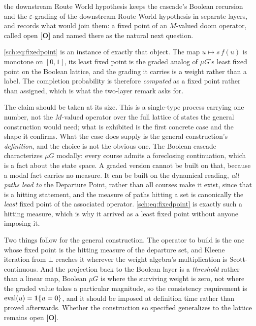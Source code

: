 \begin{remark}
\label{sch:rem:mvalued}
the downstream Route World hypothesis keeps the cascade's Boolean recursion and the
$\varepsilon$-grading of the downstream Route World hypothesis in separate
layers, and records what would join them: a fixed point of an
$M$-valued doom operator, called open \textbf{[O]} and named there as
the natural next question.

\eqref{sch:eq:fixedpoint} is an instance of exactly that object. The map
$u\mapsto s\,f(u)$ is monotone on $[0,1]$, its least fixed point is the
graded analog of $\mu G$'s least fixed point on the Boolean lattice,
and the grading it carries is a weight rather than a label. The
completion probability is therefore \emph{computed} as a fixed point
rather than assigned, which is what the two-layer remark asks for.

The claim should be taken at its size. This is a single-type process
carrying one number, not the $M$-valued operator over the full lattice
of states the general construction would need; what is exhibited is the
first concrete case and the shape it confirms. What the case does supply is the general construction's
\emph{definition}, and the choice is not the obvious one. The Boolean
cascade characterizes $\mu G$ modally: every course admits a foreclosing
continuation, which is a fact about the state space. A graded version
cannot be built on that, because a modal fact carries no measure. It can
be built on the dynamical reading, \emph{all paths lead to} the
Departure Point, rather than all courses make it exist, since that is
a hitting statement, and the measure of paths hitting a set is
canonically the \emph{least} fixed point of the associated operator.
\eqref{sch:eq:fixedpoint} is exactly such a hitting measure, which is why
it arrived as a least fixed point without anyone imposing it.

Two things follow for the general construction. The operator to build is
the one whose fixed point is the hitting measure of the departure set,
and Kleene iteration from $\bot$ reaches it wherever the weight algebra's
multiplication is Scott-continuous. And the projection back to the
Boolean layer is a \emph{threshold} rather than a linear map, Boolean
$\mu G$ is where the surviving weight is zero, not where the graded value
takes a particular magnitude, so the consistency requirement is
$\mathrm{eval}(u)=\mathbf{1}\{u=0\}$, and it should be imposed at definition
time rather than proved afterwards. Whether the construction so specified
generalizes to the lattice remains open \textbf{[O]}.
\end{remark}

